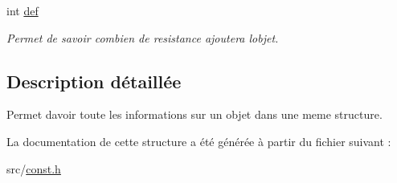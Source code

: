 \begin{DoxyCompactItemize}
\mbox{\label{structs__objet_aaa978e70922dbd4d6f04dd7f9f43a22a}} 
int \hyperlink{structs__objet_aaa978e70922dbd4d6f04dd7f9f43a22a}{def}
\begin{DoxyCompactList}\small\item\em Permet de savoir combien de resistance ajoutera l\textquotesingle{}objet. \end{DoxyCompactList}\end{DoxyCompactItemize}


\subsection{Description détaillée}
Permet d\textquotesingle{}avoir toute les informations sur un objet dans une meme structure. 

La documentation de cette structure a été générée à partir du fichier suivant \+:\begin{DoxyCompactItemize}
\item 
src/\hyperlink{const_8h}{const.\+h}\end{DoxyCompactItemize}
